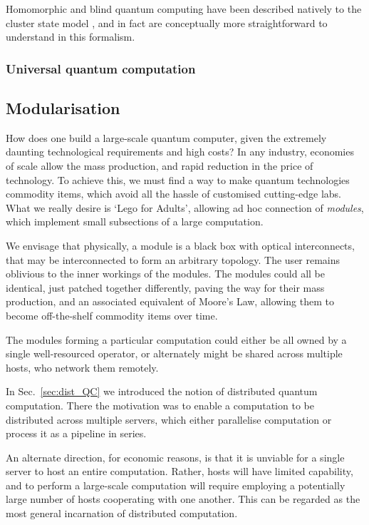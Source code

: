 \documentclass[aps,rmp,twocolumn,amsmath,amssymb,nofootinbib,superscriptaddress]{revtex4}
\newcommand{\comment}[1]{{\color{blue}{\textbf{#1}}}}
\begin{document}
Homomorphic and blind quantum computing have been described natively to the cluster state model \cite{homoCS}, and in fact are conceptually more straightforward to understand in this formalism. 

%
%

\subsubsection{Universal quantum computation}

\comment{To do}

%
%

\subsection{Modularisation} \label{sec:module}

How does one build a large-scale quantum computer, given the extremely daunting technological requirements and high costs? In any industry, economies of scale allow the mass production, and rapid reduction in the price of technology. To achieve this, we must find a way to make quantum technologies commodity items, which avoid all the hassle of customised cutting-edge labs. What we really desire is `Lego for Adults', allowing ad hoc connection of \emph{modules}, which implement small subsections of a large computation.

We envisage that physically, a module is a black box with optical interconnects, that may be interconnected to form an arbitrary topology. The user remains oblivious to the inner workings of the modules. The modules could all be identical, just patched together differently, paving the way for their mass production, and an associated equivalent of Moore's Law, allowing them to become off-the-shelf commodity items over time.

The modules forming a particular computation could either be all owned by a single well-resourced operator, or alternately might be shared across multiple hosts, who network them remotely.

In Sec.~\ref{sec:dist_QC} we introduced the notion of distributed quantum computation. There the motivation was to enable a computation to be distributed across multiple servers, which either parallelise computation or process it as a pipeline in series.

An alternate direction, for economic reasons, is that it is unviable for a single server to host an entire computation. Rather, hosts will have limited capability, and to perform a large-scale computation will require employing a potentially large number of hosts cooperating with one another. This can be regarded as the most general incarnation of distributed computation.
\end{document}
